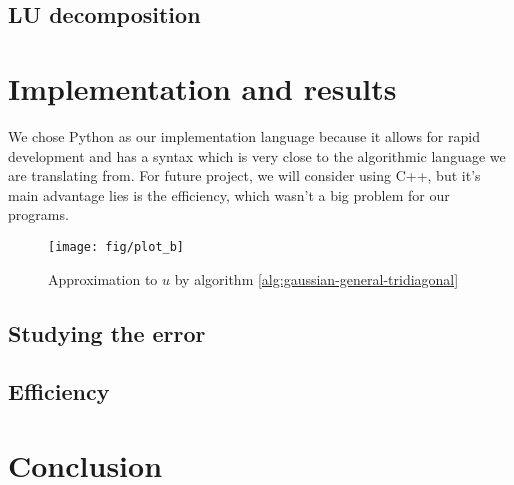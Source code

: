 \documentclass[a4paper]{article}
\begin{document}
\subsection{LU decomposition}


\section{Implementation and results}\label{sec:implementation_and_results}
We chose Python as our implementation language because it allows for rapid development and has a syntax which is very close to the algorithmic language we are translating from. For future project, we will consider using C++, but it's main advantage lies is the efficiency, which wasn't a big problem for our programs.

\begin{figure}[ht]
\texttt{[image: fig/plot\_b]}
\caption{Approximation to $u$ by algorithm \ref{alg:gaussian-general-tridiagonal}}
\end{figure}

\subsection{Studying the error}

\subsection{Efficiency}


\section{Conclusion}\label{sec:conclusion}

%
%

{}
\end{document}

